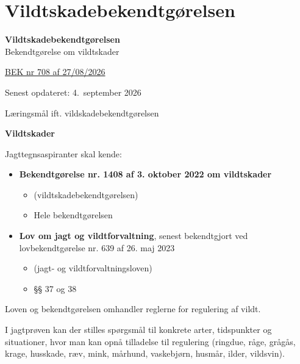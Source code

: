 \section{Vildtskadebekendtgørelsen}

\begin{frame}
  \vspace{3em}
  \begin{center}
    {\LARGE \textbf{Vildtskadebekendtgørelsen}}
    \vspace{2em}
    \\ Bekendtgørelse om vildtskader
\par
{\normalsize \href{https://www.retsinformation.dk/eli/lta/2026/708}{BEK nr 708 af 27/08/2026}}
\vspace{0.5em}
\par
{\small Senest opdateret: 4.\ september 2026}
\vspace{1em}
\par
  \end{center}
\end{frame}
\begin{frame}{Læringsmål ift. vildskadebekendtgørelsen}

\textbf{Vildtskader}

\vspace{0.2cm}

Jagttegnsaspiranter skal kende:

\begin{itemize}
    \item \textbf{Bekendtgørelse nr. 1408 af 3. oktober 2022 om vildtskader}
    \begin{itemize}
        \item (vildtskadebekendtgørelsen)
        \item Hele bekendtgørelsen
    \end{itemize}

    \item \textbf{Lov om jagt og vildtforvaltning}, senest bekendtgjort ved
    lovbekendtgørelse nr. 639 af 26. maj 2023
    \begin{itemize}
        \item (jagt- og vildtforvaltningsloven)
        \item §§ 37 og 38
    \end{itemize}
\end{itemize}

\vspace{0.2cm}

Loven og bekendtgørelsen omhandler reglerne for regulering af vildt.

\vspace{0.2cm}

I jagtprøven kan der stilles spørgsmål til konkrete arter, tidspunkter og
situationer, hvor man kan opnå tilladelse til regulering (ringdue, råge, grågås,
krage, husskade, ræv, mink, mårhund, vaskebjørn, husmår, ilder, vildsvin).

\end{frame}


